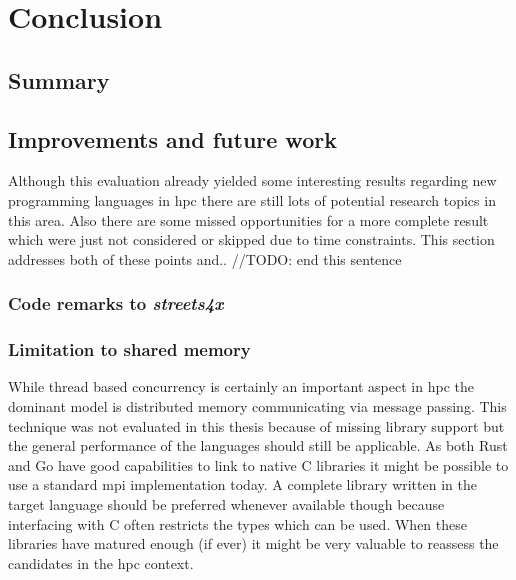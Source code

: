 \chapter{Conclusion}
\label{ch:Conclusion}


\section{Summary}
\label{sec:Conclusion::Summary}

\section{Improvements and future work}
\label{sec:Conclusion::Improvements}

Although this evaluation already yielded some interesting results regarding new programming languages in \gls{hpc} there are still lots of potential research topics in this area. Also there are some missed opportunities for a more complete result which were just not considered or skipped due to time constraints. This section addresses both of these points and.. //TODO: end this sentence

\subsection{Code remarks to \textit{streets4x}}
\label{subsec:Conclusion::Improvements::CodeRemarks}



\subsection{Limitation to shared memory}
\label{subsec:Conclusion::Improvements::SharedMemory}

While thread based concurrency is certainly an important aspect in \gls{hpc} the dominant model is distributed memory communicating via message passing. This technique was not evaluated in this thesis because of missing library support but the general performance of the languages should still be applicable. As both Rust and Go have good capabilities to link to native C libraries it might be possible to use a standard \gls{mpi} implementation today. A complete library written in the target language should be preferred whenever available though because interfacing with C often restricts the types which can be used. When these libraries have matured enough (if ever) it might be very valuable to reassess the candidates in the \gls{hpc} context.

